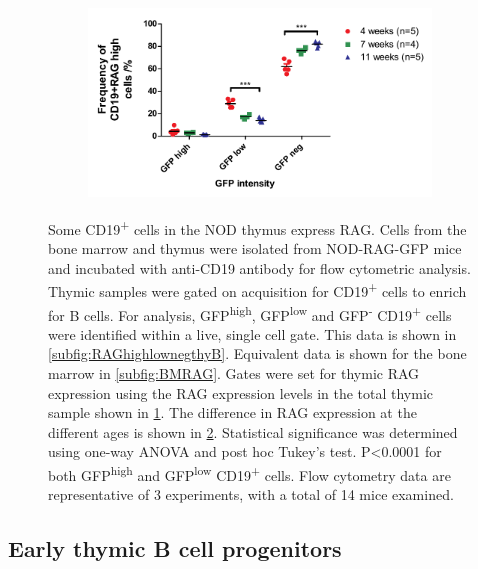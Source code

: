 \begin{figure}
\begin{subfigure}{0.5\textwidth}
	\caption{}
	\label{subfig:totalthyRAG}
	\end{subfigure}
	\begin{subfigure}{\textwidth}
	\includegraphics[width=\textwidth]{Figures/RAGhighlownegative.pdf}
	\caption{}
	\label{subfig:RAGhighlowneggraph}
	\end{subfigure}
\caption[Some CD19\textsuperscript{+} cells in the NOD thymus express RAG]{Some CD19\textsuperscript{+} cells in the NOD thymus express RAG. 
Cells from the bone marrow and thymus were isolated from NOD-RAG-GFP mice and incubated with anti-CD19 antibody for flow cytometric analysis.
Thymic samples were gated on acquisition for CD19\textsuperscript{+} cells to enrich for B cells.
For analysis, GFP\textsuperscript{high}, GFP\textsuperscript{low} and GFP\textsuperscript{-} CD19\textsuperscript{+} cells were identified within a live, single cell gate. 
This data is shown in \ref{subfig:RAGhighlownegthyB}.
Equivalent data is shown for the bone marrow in \ref{subfig:BMRAG}.
Gates were set for thymic RAG expression using the RAG expression levels in the total thymic sample shown in \ref{subfig:totalthyRAG}.
The difference in RAG expression at the different ages is shown in \ref{subfig:RAGhighlowneggraph}. Statistical significance was determined using one-way ANOVA and post hoc Tukey's test. P<0.0001 for both GFP\textsuperscript{high} and GFP\textsuperscript{low} CD19\textsuperscript{+} cells.
Flow cytometry data are representative of 3 experiments, with a total of 14 mice examined.}
\label{fig:GFP}
\end{figure}


\subsection{Early thymic B cell progenitors}
\label{subsec:earlyprogens}

